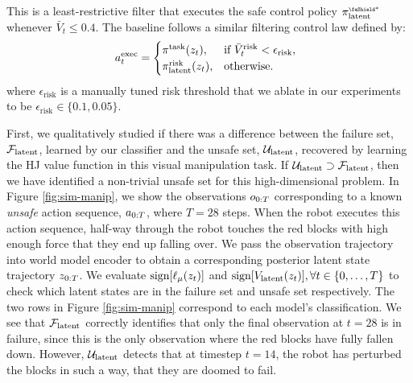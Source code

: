 This is a least-restrictive filter that executes the safe control policy $\fallbackLatent$ whenever $\bar{V}_t \leq 0.4$. 
The \cmdp baseline follows a similar filtering control law defined by:
\begin{align}
   a^\text{exec}_{t} = 
    \begin{cases}
    \pi^{\text{task}}(z_t) ,& \text{if } \bar{V}^{\textrm{risk}}_t < \epsilon_{\textrm{risk}}, \;\; \\
    \pi^{\textrm{risk}}_{\textrm{latent}}(z_t),              & \text{otherwise.}  \\ 
    \end{cases}
\end{align}
where $\epsilon_{\textrm{risk}}$ is a manually tuned risk threshold that we ablate in our experiments to be $\epsilon_{\textrm{risk}} \in \{0.1, 0.05\}$.


First, we qualitatively studied if there was a difference between the failure set, $\mathcal{F}_\textrm{latent}$, learned by our classifier and the unsafe set, $\mathcal{U}_{\textrm{latent}}$, recovered by learning the HJ value function in this visual manipulation task. 
If $\mathcal{U}_{\textrm{latent}} \supset \mathcal{F}_\textrm{latent}$, then we have identified a non-trivial unsafe set for this high-dimensional problem. 
In Figure \ref{fig:sim-manip}, we show the observations $o_{0:T}$ corresponding to a known \textit{unsafe} action sequence, $a_{0:T}$, where $T = 28$ steps. 
When the robot executes this action sequence, half-way through the robot touches the red blocks with high enough force that they end up falling over. 
We pass the observation trajectory into world model encoder to obtain a corresponding posterior latent state trajectory $z_{0:T}$. 
We evaluate $\text{sign}[\ell_\mu(z_t)]$ and $\text{sign}[V_{\textrm{latent}}(z_t)], \forall t \in \{0,\hdots,T\}$ to check which latent states are in the failure set and unsafe set respectively. The two rows in Figure \ref{fig:sim-manip} correspond to each model's classification. We see that $\mathcal{F}_\textrm{latent}$ correctly identifies that only the final observation at $t=28$ is in failure, since this is the only observation where the red blocks have fully fallen down. 
However, $\mathcal{U}_{\textrm{latent}}$ detects that at timestep $t=14$, the robot has perturbed the blocks in such a way, that they are doomed to fail. 


